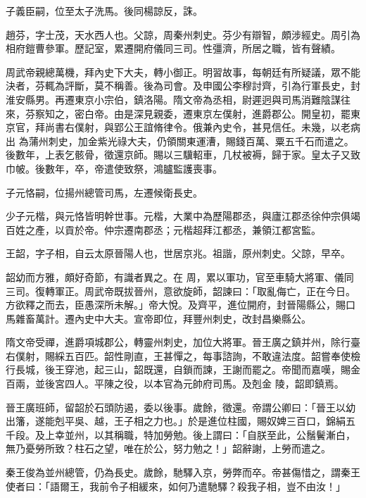 \begin{pinyinscope}
 子義臣嗣，位至太子洗馬。後同楊諒反，誅。



 趙芬，字士茂，天水西人也。父諒，周秦州刺史。芬少有辯智，頗涉經史。周引為相府鎧曹參軍。歷記室，累遷開府儀同三司。性彊濟，所居之職，皆有聲績。



 周武帝親總萬機，拜內史下大夫，轉小御正。明習故事，每朝廷有所疑議，眾不能決者，芬輒為評斷，莫不稱善。後為司會。及申國公李穆討齊，引為行軍長史，封淮安縣男。再遷東京小宗伯，鎮洛陽。隋文帝為丞相，尉遲迥與司馬消難陰謀往來，芬察知之，密白帝。由是深見親委，遷東京左僕射，進爵郡公。開皇初，罷東京官，拜尚書右僕射，與郢公王誼脩律令。俄兼內史令，甚見信任。未幾，以老病出
 為蒲州刺史，加金紫光祿大夫，仍領關東運漕，賜錢百萬、粟五千石而遣之。後數年，上表乞骸骨，徵還京師。賜以三驥軺車，几杖被褥，歸于家。皇太子又致巾帔。後數年，卒，帝遣使致祭，鴻臚監護喪事。



 子元恪嗣，位揚州總管司馬，左遷候衛長史。



 少子元楷，與元恪皆明幹世事。元楷，大業中為歷陽郡丞，與廬江郡丞徐仲宗俱竭百姓之產，以貢於帝。仲宗遷南郡丞；元楷超拜江都丞，兼領江都宮監。



 王韶，字子相，自云太原晉陽人也，世居京兆。祖諧，原州刺史。父諒，早卒。



 韶幼而方雅，頗好奇節，有識者異之。在
 周，累以軍功，官至車騎大將軍、儀同三司。復轉軍正。周武帝既拔晉州，意欲旋師，韶諫曰：「取亂侮亡，正在今日。方欲釋之而去，臣愚深所未解。」帝大悅。及齊平，進位開府，封晉陽縣公，賜口馬雜畜萬計。遷內史中大夫。宣帝即位，拜豐州刺史，改封昌樂縣公。



 隋文帝受禪，進爵項城郡公，轉靈州刺史，加位大將軍。晉王廣之鎮并州，除行臺右僕射，賜綵五百匹。韶性剛直，王甚憚之，每事諮詢，不敢違法度。韶嘗奉使檢行長城，後王穿池，起三山，韶既還，自鎖而諫，王謝而罷之。帝聞而嘉嘆，賜金百兩，並後宮四人。平陳之役，以本官為元帥府司馬。及剋金
 陵，韶即鎮焉。



 晉王廣班師，留韶於石頭防遏，委以後事。歲餘，徵還。帝謂公卿曰：「晉王以幼出籓，遂能剋平吳、越，王子相之力也。」於是進位柱國，賜奴婢三百口，錦絹五千段。及上幸並州，以其稱職，特加勞勉。後上謂曰：「自朕至此，公鬚鬢漸白，無乃憂勞所致？柱石之望，唯在於公，努力勉之！」韶辭謝，上勞而遣之。



 秦王俊為並州總管，仍為長史。歲餘，馳驛入京，勞弊而卒。帝甚傷惜之，謂秦王使者曰：「語爾王，我前令子相緩來，如何乃遣馳驛？殺我子相，豈不由汝！」




\end{pinyinscope}
